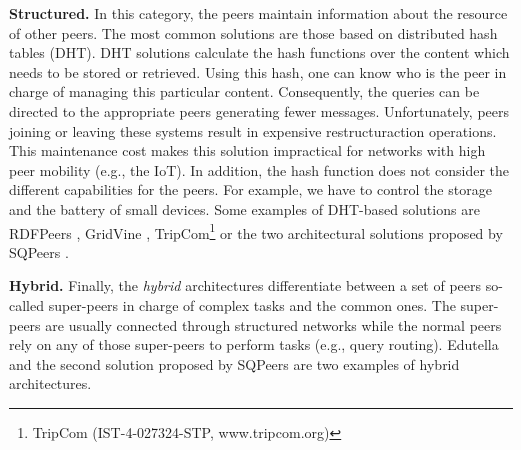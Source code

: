 \noindent\textbf{Structured.}
In this category, the peers  maintain information about the resource of other peers.
The most common solutions are those based on distributed hash tables (DHT).
DHT solutions calculate the hash functions over the content which needs to be stored or retrieved.
Using this hash, one can know who is the peer in charge of managing this particular content.
Consequently, the queries can be directed to the appropriate peers generating fewer messages.
Unfortunately, peers joining or leaving these systems result in expensive restructuraction operations.
This maintenance cost makes this solution impractical for networks with high peer mobility (e.g., the IoT).
In addition, the hash function does not consider the different capabilities for the peers.
For example, we have to control the storage and the battery of small devices.
Some examples of DHT-based solutions are
RDFPeers \citep{cai_rdfpeers:_2004},
GridVine \citep{cudre-mauroux_gridvine:_2007},
TripCom\footnote{TripCom (IST-4-027324-STP, www.tripcom.org)}
or the two architectural solutions proposed by SQPeers \citep{kokkinidis_query_2006}.

\noindent\textbf{Hybrid.}
Finally, the \emph{hybrid} architectures differentiate between a set of peers so-called super-peers in charge of complex tasks and the common ones.
The super-peers are usually connected through structured networks while the normal peers rely on any of those super-peers to perform tasks (e.g., query routing).
Edutella \citep{nejdl_super-peer-based_2003} and the second solution proposed by SQPeers \citep{kokkinidis_query_2006} are two examples of hybrid architectures.

